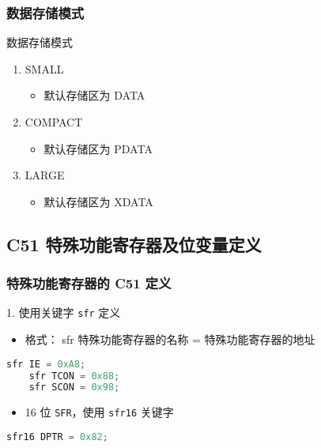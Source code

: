 \documentclass{beamer}
\begin{document}
\subsubsection{数据存储模式}

\begin{frame}{数据存储模式}
    \begin{enumerate}
        \item
            SMALL

            \begin{itemize}

                \item
                    默认存储区为 DATA
            \end{itemize}
        \item
            COMPACT

            \begin{itemize}

                \item
                    默认存储区为 PDATA
            \end{itemize}
        \item
            LARGE

            \begin{itemize}

                \item
                    默认存储区为 XDATA
            \end{itemize}
    \end{enumerate}

\end{frame}

\subsection{C51 特殊功能寄存器及位变量定义}

\subsubsection{特殊功能寄存器的 C51 定义}

\begin{frame}[fragile]{1. 使用关键字 \texttt{sfr} 定义}
    \begin{itemize}
        \item
            格式： sfr 特殊功能寄存器的名称 = 特殊功能寄存器的地址
    \end{itemize}

    \begin{lstlisting}[language=C]
    sfr IE = 0xA8;
    sfr TCON = 0x88;
    sfr SCON = 0x98;
    \end{lstlisting}

    \begin{itemize}

        \item
            16 位 \texttt{SFR}，使用 \texttt{sfr16} 关键字
    \end{itemize}

    \begin{lstlisting}[language=C]
    sfr16 DPTR = 0x82;
    \end{lstlisting}
\end{frame}
\end{document}
